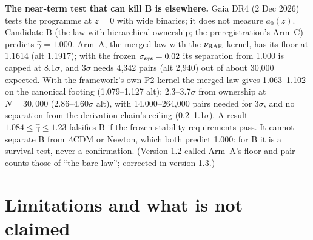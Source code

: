 \documentclass[10pt]{article}
\begin{document}
\textbf{The near-term test that can kill B is elsewhere.} Gaia DR4 (2 Dec 2026) tests the programme at $z=0$ with wide binaries; it does not measure $a_0(z)$. Candidate B (the law with hierarchical ownership; the preregistration's Arm~C) predicts $\hat\gamma=1.000$. Arm~A, the merged law with the $\nu_{\rm RAR}$ kernel, has its floor at 1.1614 (alt 1.1917); with the frozen $\sigma_{\rm sys}=0.02$ its separation from 1.000 is capped at 8.1$\sigma$, and 3$\sigma$ needs 4,342 pairs (alt 2,940) out of about 30,000 expected. With the framework's own P2 kernel the merged law gives 1.063--1.102 on the canonical footing (1.079--1.127 alt): 2.3--3.7$\sigma$ from ownership at $N=30{,}000$ (2.86--4.60$\sigma$ alt), with 14,000--264,000 pairs needed for 3$\sigma$, and no separation from the derivation chain's ceiling (0.2--1.1$\sigma$). A result $1.084\le\hat\gamma\le1.23$ falsifies B if the frozen stability requirements pass. It cannot separate B from $\Lambda$CDM or Newton, which both predict 1.000: for B it is a survival test, never a confirmation. (Version 1.2 called Arm~A's floor and pair counts those of ``the bare law''; corrected in version 1.3.)

\section{Limitations and what is not claimed}\label{sec:lim}
\end{document}

